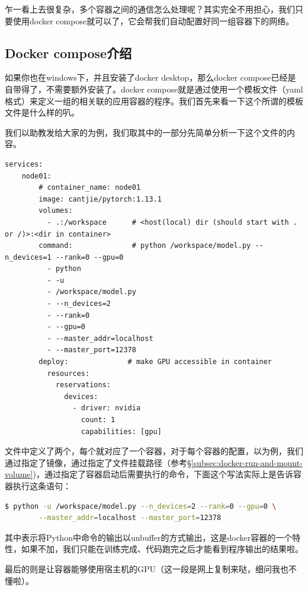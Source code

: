 乍一看上去很复杂，多个容器之间的通信怎么处理呢？其实完全不用担心，我们只要使用docker compose就可以了，它会帮我们自动配置好同一组容器下的网络。

\subsection{Docker compose介绍}

如果你也在windows下，并且安装了docker desktop，那么docker compose已经是自带得了，不需要额外安装了。docker compose就是通过使用一个模板文件（yaml格式）来定义一组的相关联的应用容器的程序。我们首先来看一下这个所谓的模板文件是什么样的叭。

我们以助教发给大家的为例，我们取其中的一部分先简单分析一下这个文件的内容。
\begin{lstlisting}
services:
    node01:           
        # container_name: node01
        image: cantjie/pytorch:1.13.1
        volumes:
          - .:/workspace      # <host(local) dir (should start with . or /)>:<dir in container>
        command:              # python /workspace/model.py --n_devices=1 --rank=0 --gpu=0
          - python
          - -u
          - /workspace/model.py 
          - --n_devices=2
          - --rank=0
          - --gpu=0
          - --master_addr=localhost
          - --master_port=12378
        deploy:              # make GPU accessible in container
          resources:
            reservations:
              devices:
                - driver: nvidia
                  count: 1
                  capabilities: [gpu]
\end{lstlisting}

文件中定义了两个，每个就对应了一个容器，对于每个容器的配置，以为例，我们通过指定了镜像，通过指定了文件挂载路径（参考\S\ref{subsec:docker-run-and-mount-volume})，通过指定了容器启动后需要执行的命令，下面这个写法实际上是告诉容器执行这条语句：
\begin{lstlisting}[language=bash]
    $ python -u /workspace/model.py --n_devices=2 --rank=0 --gpu=0 \
        --master_addr=localhost --master_port=12378
\end{lstlisting}
其中表示将Python中命令的输出以unbuffer的方式输出，这是docker容器的一个特性，如果不加，我们只能在训练完成、代码跑完之后才能看到程序输出的结果啦。

最后的则是让容器能够使用宿主机的GPU（这一段是网上复制来哒，细问我也不懂啦）。

